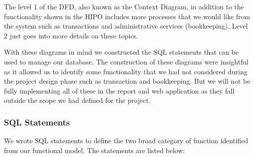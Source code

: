 \documentclass[12pt,a4paper]{report}
\begin{document}
\begin{itemize}
The level 1 of the DFD, also known as the Context Diagram, in addition to the functionality shown in the HIPO includes more processes that we would like from the system such as transactions and administrative services (bookkeeping). Level 2 just goes into more details on these topics.
\end{itemize}

With these diagrams in mind we constructed the SQL statements that can be used to manage our database. The construction of these diagrams were insightful as it allowed us to identify some functionality that we had not considered during the project design phase such as transaction and bookkeeping. But we will not be fully implementing all of these in the report and web application as they fall outside the scope we had defined for the project.  

\subsubsection{SQL Statements}
We wrote SQL statements to define the two broad category of function identified from our functional model. The statements are listed below:
\end{document}
